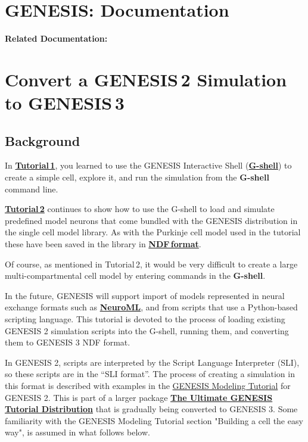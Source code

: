 \documentclass[12pt]{article}
\begin{document}
\section*{GENESIS: Documentation}

{\bf Related Documentation:}

\section*{Convert a GENESIS\,2 Simulation to GENESIS\,3}

\subsection*{Background}

In \href{../tutorial1/tutorial1.tex}{\bf Tutorial\,1}, you learned to use the GENESIS Interactive Shell (\href{../gshell/gshell.tex}{\bf G-shell})
to create a simple cell, explore it, and run the simulation from the
{\bf G-shell} command line.

\href{../tutorial2/tutorial2.tex}{\bf Tutorial\,2} continues to show how to
use the G-shell to load and simulate predefined model neurons that come
bundled with the GENESIS distribution in the single cell model library.  As
with the Purkinje cell model used in the tutorial these have been saved in
the library in \href{../ndf-file-format/ndf-file-format.tex}{\bf
NDF\,format}.

Of course, as mentioned in Tutorial\,2, it would be very difficult to create a large multi-compartmental
cell model by entering commands in the {\bf G-shell}.

In the future, GENESIS will support import of models represented in neural exchange formats such as
\href{http://neuroml.org}{\bf NeuroML}, and from scripts that use a Python-based scripting language.
This tutorial is devoted to the process of loading existing GENESIS 2 simulation scripts into the
G-shell, running them, and converting them to GENESIS 3 NDF format.

In GENESIS 2, scripts are interpreted by the Script Language Interpreter (SLI), so these scripts are
in the ``SLI format''.  The process of creating a simulation in this format is described with
examples in the \href{http://genesis-sim.org/GENESIS/UGTD/Tutorials/genprog/genprog.html}{GENESIS
Modeling Tutorial} for GENESIS 2.  This is part of a larger package
\href{http://www.genesis-sim.org/GENESIS/UGTD.html}{\bf The Ultimate GENESIS Tutorial Distribution}
that is gradually being converted to GENESIS 3.  Some familiarity with the GENESIS Modeling Tutorial
section "Building a cell the easy way", is assumed in what follows below.
\end{document}
